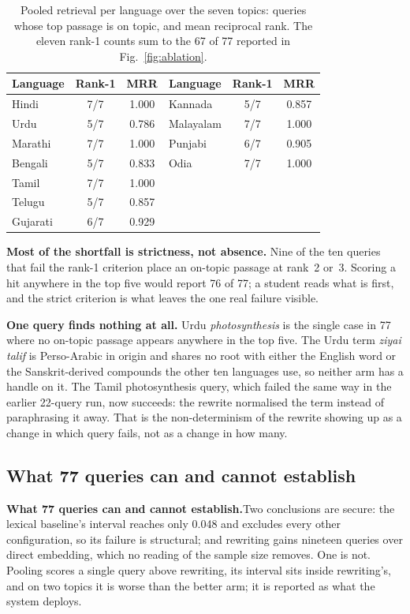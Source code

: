 \begin{table}
\caption{Pooled retrieval per language over the seven topics: queries whose top passage is on topic, and mean reciprocal rank. The eleven rank-1 counts sum to the 67 of 77 reported in Fig.~\ref{fig:ablation}.}
\label{tab:perlang}
\centering
\footnotesize
\setlength{\tabcolsep}{5pt}
\begin{tabular}{@{}lcc@{\hskip 10pt}lcc@{}}
\toprule
\textbf{Language} & \textbf{Rank-1} & \textbf{MRR} & \textbf{Language} & \textbf{Rank-1} & \textbf{MRR} \\
\midrule
Hindi     & 7/7 & 1.000 & Kannada   & 5/7 & 0.857 \\
Urdu      & 5/7 & 0.786 & Malayalam & 7/7 & 1.000 \\
Marathi   & 7/7 & 1.000 & Punjabi   & 6/7 & 0.905 \\
Bengali   & 5/7 & 0.833 & Odia      & 7/7 & 1.000 \\
Tamil     & 7/7 & 1.000 & \multicolumn{3}{l}{} \\
Telugu    & 5/7 & 0.857 & \multicolumn{3}{l}{} \\
Gujarati  & 6/7 & 0.929 & \multicolumn{3}{l}{} \\
\bottomrule
\end{tabular}
\end{table}

\textbf{Most of the shortfall is strictness, not absence.} Nine of the ten queries that fail the rank-1 criterion place an on-topic passage at rank~2 or~3. Scoring a hit anywhere in the top five would report 76 of 77; a student reads what is first, and the strict criterion is what leaves the one real failure visible.

\textbf{One query finds nothing at all.} Urdu \emph{photosynthesis} is the single case in 77 where no on-topic passage appears anywhere in the top five. The Urdu term \emph{ziyai talif} is Perso-Arabic in origin and shares no root with either the English word or the Sanskrit-derived compounds the other ten languages use, so neither arm has a handle on it. The Tamil photosynthesis query, which failed the same way in the earlier 22-query run, now succeeds: the rewrite normalised the term instead of paraphrasing it away. That is the non-determinism of the rewrite showing up as a change in which query fails, not as a change in how many.
\fi


\ifspringer\subsection{What 77 queries can and cannot establish}\else\textbf{What 77 queries can and cannot establish.}\fi Two conclusions are secure: the lexical baseline's interval reaches only 0.048 and excludes every other configuration, so its failure is structural; and rewriting gains nineteen queries over direct embedding, which no reading of the sample size removes. One is not. Pooling scores a single query above rewriting, its interval sits inside rewriting's, and on two topics it is worse than the better arm; it is reported as what the system deploys.

